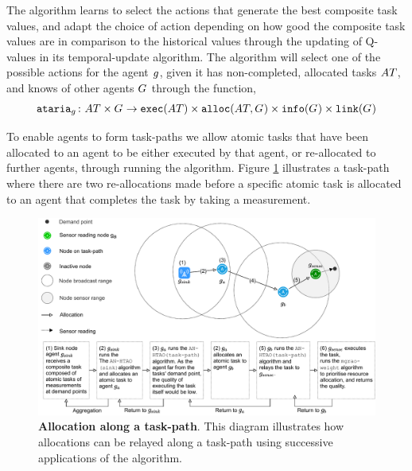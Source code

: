 The \acronymATARIA{}{} algorithm learns to select the actions that generate the best composite task values, and adapt the choice of action depending on how good the composite task values are in comparison to the historical values through the updating of Q-values in its temporal-update algorithm. The algorithm will select one of the possible actions for the agent $g_{}^{}$, given it has non-completed, allocated tasks $\setAtomicTask{}{}$, and knows of other agents $G_{}^{}$ through the function,
\begin{equation}
	\label{eq:ataria}\formalATARIA{}{}
\end{equation}

To enable agents to form task-paths we allow atomic tasks that have been allocated to an agent to be either executed by that agent, or re-allocated to further agents, through running the \acronymATARIA{}{} algorithm. Figure \ref{fig:arc-flow} illustrates a task-path where there are two re-allocations made before a specific atomic task is allocated to an agent that completes the task by taking a measurement.
\begin{figure}[ht]
	\centering
	\includegraphics[width=0.8\linewidth, trim={25pt 0pt 25pt 0pt, clip}]{arc-flow}
	\caption{\textbf{Allocation along a task-path}. This diagram illustrates how allocations can be relayed along a task-path using successive applications of the \acronymATARIA{}{} algorithm.}
	\label{fig:arc-flow}
\end{figure}